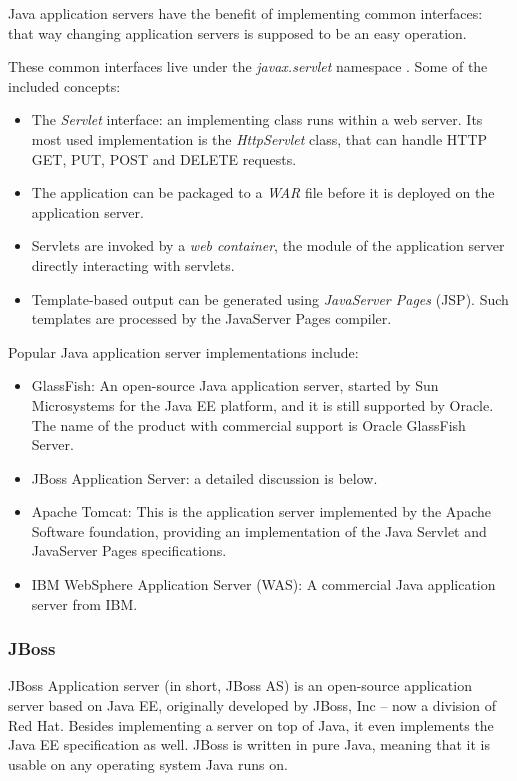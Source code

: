 Java application servers have the benefit of implementing common interfaces:
that way changing application servers is supposed to be an easy operation.

These common interfaces live under the \emph{javax.servlet} namespace \cite{javax-servlet}.
Some of the included concepts:

\begin{itemize}
\item The \emph{Servlet} interface: an implementing class runs within a web
server. Its most used implementation is the \emph{HttpServlet} class, that can
handle HTTP GET, PUT, POST and DELETE requests.
\item The application can be packaged to a \emph{WAR} file before it is deployed
on the application server.
\item Servlets are invoked by a \emph{web container}, the module of the
application server directly interacting with servlets.
\item Template-based output can be generated using \emph{JavaServer Pages}
(JSP). Such templates are processed by the JavaServer Pages compiler.
\end{itemize}

Popular Java application server implementations include:

\begin{itemize}
\item GlassFish: An open-source Java application server, started by Sun
Microsystems for the Java EE platform, and it is still supported by Oracle. The
name of the product with commercial support is Oracle GlassFish Server.
\item JBoss Application Server: a detailed discussion is below.
\item Apache Tomcat: This is the application server implemented by the Apache
Software foundation, providing an implementation of the Java Servlet and
JavaServer Pages specifications.
\item IBM WebSphere Application Server (WAS): A commercial Java application
server from IBM.
\end{itemize}

\subsubsection*{JBoss}

JBoss Application server (in short, JBoss AS) is an open-source application server
based on Java EE, originally developed by JBoss, Inc -- now a division of Red
Hat. Besides implementing a server on top of Java, it even implements the Java
EE specification as well.  JBoss is written in pure Java, meaning that it is
usable on any operating system Java runs on.


